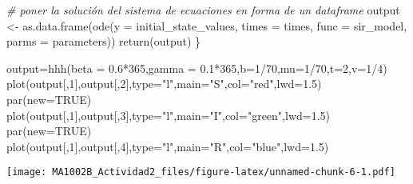 \documentclass[
]{article}
\newenvironment{Shaded}{\begin{snugshade}}{\end{snugshade}}
\newcommand{\AttributeTok}[1]{\textcolor[rgb]{0.77,0.63,0.00}{#1}}
\newcommand{\CommentTok}[1]{\textcolor[rgb]{0.56,0.35,0.01}{\textit{#1}}}
\newcommand{\ConstantTok}[1]{\textcolor[rgb]{0.00,0.00,0.00}{#1}}
\newcommand{\DecValTok}[1]{\textcolor[rgb]{0.00,0.00,0.81}{#1}}
\newcommand{\FloatTok}[1]{\textcolor[rgb]{0.00,0.00,0.81}{#1}}
\newcommand{\FunctionTok}[1]{\textcolor[rgb]{0.00,0.00,0.00}{#1}}
\newcommand{\NormalTok}[1]{#1}
\newcommand{\OtherTok}[1]{\textcolor[rgb]{0.56,0.35,0.01}{#1}}
\newcommand{\SpecialCharTok}[1]{\textcolor[rgb]{0.00,0.00,0.00}{#1}}
\newcommand{\StringTok}[1]{\textcolor[rgb]{0.31,0.60,0.02}{#1}}
\begin{document}
\begin{Shaded}
\begin{Highlighting}[]
\CommentTok{\# poner la solución del sistema de ecuaciones en forma de un dataframe}
\NormalTok{output }\OtherTok{\textless{}{-}} \FunctionTok{as.data.frame}\NormalTok{(}\FunctionTok{ode}\NormalTok{(}\AttributeTok{y =}\NormalTok{ initial\_state\_values, }
                            \AttributeTok{times =}\NormalTok{ times, }
                            \AttributeTok{func =}\NormalTok{ sir\_model,}
                            \AttributeTok{parms =}\NormalTok{ parameters))}
\FunctionTok{return}\NormalTok{(output)}
\NormalTok{\}}
\end{Highlighting}
\end{Shaded}

\begin{Shaded}
\begin{Highlighting}[]
\NormalTok{output}\OtherTok{=}\FunctionTok{hhh}\NormalTok{(}\AttributeTok{beta =} \FloatTok{0.6}\SpecialCharTok{*}\DecValTok{365}\NormalTok{,}\AttributeTok{gamma =} \FloatTok{0.1}\SpecialCharTok{*}\DecValTok{365}\NormalTok{,}\AttributeTok{b=}\DecValTok{1}\SpecialCharTok{/}\DecValTok{70}\NormalTok{,}\AttributeTok{mu=}\DecValTok{1}\SpecialCharTok{/}\DecValTok{70}\NormalTok{,}\AttributeTok{t=}\DecValTok{2}\NormalTok{,}\AttributeTok{v=}\DecValTok{1}\SpecialCharTok{/}\DecValTok{4}\NormalTok{)}
\FunctionTok{plot}\NormalTok{(output[,}\DecValTok{1}\NormalTok{],output[,}\DecValTok{2}\NormalTok{],}\AttributeTok{type=}\StringTok{"l"}\NormalTok{,}\AttributeTok{main=}\StringTok{"S"}\NormalTok{,}\AttributeTok{col=}\StringTok{"red"}\NormalTok{,}\AttributeTok{lwd=}\FloatTok{1.5}\NormalTok{)}
\FunctionTok{par}\NormalTok{(}\AttributeTok{new=}\ConstantTok{TRUE}\NormalTok{)}
\FunctionTok{plot}\NormalTok{(output[,}\DecValTok{1}\NormalTok{],output[,}\DecValTok{3}\NormalTok{],}\AttributeTok{type=}\StringTok{"l"}\NormalTok{,}\AttributeTok{main=}\StringTok{"I"}\NormalTok{,}\AttributeTok{col=}\StringTok{"green"}\NormalTok{,}\AttributeTok{lwd=}\FloatTok{1.5}\NormalTok{)}
\FunctionTok{par}\NormalTok{(}\AttributeTok{new=}\ConstantTok{TRUE}\NormalTok{)}
\FunctionTok{plot}\NormalTok{(output[,}\DecValTok{1}\NormalTok{],output[,}\DecValTok{4}\NormalTok{],}\AttributeTok{type=}\StringTok{"l"}\NormalTok{,}\AttributeTok{main=}\StringTok{"R"}\NormalTok{,}\AttributeTok{col=}\StringTok{"blue"}\NormalTok{,}\AttributeTok{lwd=}\FloatTok{1.5}\NormalTok{)}
\end{Highlighting}
\end{Shaded}

\texttt{[image: MA1002B\_Actividad2\_files/figure-latex/unnamed-chunk-6-1.pdf]}
\end{document}
